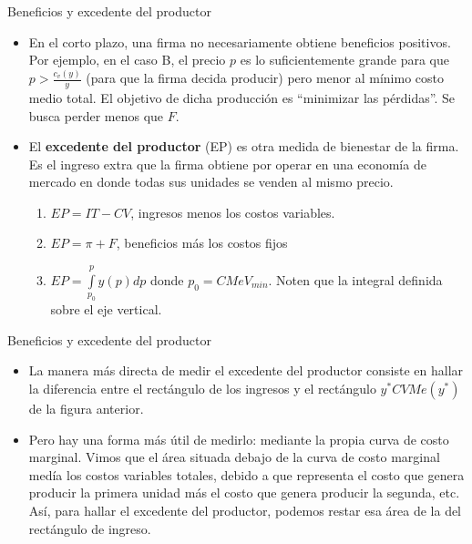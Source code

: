 \documentclass{beamer}
\theoremstyle{definition}
\begin{document}
\begin{frame}{Beneficios y excedente del productor}
\begin{itemize}
\item En el corto
plazo, una firma no necesariamente obtiene beneficios positivos. Por ejemplo, en el caso B, el precio $p$ es lo suficientemente grande para que $p>\frac{c_{v}\left(
y\right) }{y}$ (para que la firma decida producir) pero menor al m\'{i}nimo costo medio total. El objetivo de dicha producci\'{o}n es ``minimizar las p\'{e}rdidas''. Se busca perder menos que $F$.
\item El \textbf{excedente del productor} (EP) es otra medida de bienestar de la firma. Es el ingreso extra que la firma obtiene por operar en una econom\'{i}a de mercado en donde todas sus unidades se venden al mismo precio.

\begin{enumerate}[label=\textbf{(\Alph*)}]
    \item $EP=IT-CV$, ingresos menos
los costos variables.
    \item $EP=\pi+F$, beneficios más los costos fijos
    \item $EP=\displaystyle\int\limits_{p_{0}}^{p}y\left( p\right) dp$ donde $p_{0}=CMeV_{min}$. Noten que la integral definida sobre el eje vertical.
\end{enumerate}
\end{itemize}
\end{frame}
\begin{solucion}
\begin{frame}{Beneficios y excedente del productor}
\begin{itemize}
\item La manera más directa de medir el excedente del productor consiste en hallar la
diferencia entre el rectángulo de los ingresos y el rectángulo $y^*CVMe(y^*)$ de la figura
anterior. 
\item Pero hay una forma más útil de medirlo: mediante la propia curva de costo
marginal. Vimos que el área situada debajo de la curva de costo marginal medía los costos variables totales, debido a que representa el costo que genera producir la primera unidad más el costo que genera producir la segunda, etc. Así, para hallar el excedente del productor, podemos restar esa área de la del rectángulo de ingreso.
\end{itemize}
\end{frame}
\end{solucion}
\end{document}
